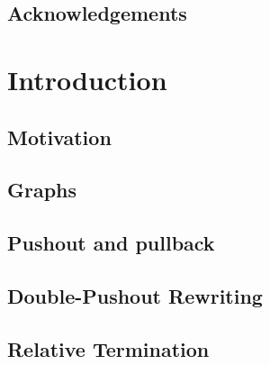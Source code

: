 \documentclass{report}
\begin{document}
  
  
  
 
\section*{Acknowledgements}

\newpage       


\tableofcontents  
\newpage      
 
\chapter{Introduction}
\section{Motivation} 

\section{Graphs}
 
\section{Pushout and pullback}  

\section{Double-Pushout Rewriting}
 
\section{Relative Termination}




\end{document}
